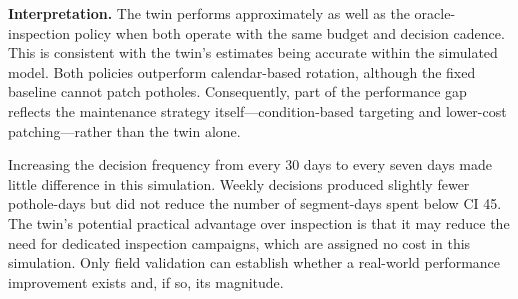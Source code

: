 \documentclass[11pt,a4paper]{article}
\begin{document}
\textbf{Interpretation.} The twin performs approximately as well as the oracle-inspection policy when both operate with the same budget and decision cadence. This is consistent with the twin's estimates being accurate within the simulated model. Both policies outperform calendar-based rotation, although the fixed baseline cannot patch potholes. Consequently, part of the performance gap reflects the maintenance strategy itself---condition-based targeting and lower-cost patching---rather than the twin alone.

Increasing the decision frequency from every 30 days to every seven days made little difference in this simulation. Weekly decisions produced slightly fewer pothole-days but did not reduce the number of segment-days spent below CI 45. The twin's potential practical advantage over inspection is that it may reduce the need for dedicated inspection campaigns, which are assigned no cost in this simulation. Only field validation can establish whether a real-world performance improvement exists and, if so, its magnitude.

\end{document}
